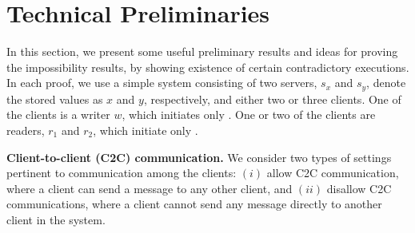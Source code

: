 \section{Technical Preliminaries}
\label{sec:summary}
In this section, we present some useful preliminary results and ideas for  proving the impossibility results, by showing existence of certain contradictory executions.
In each proof, we use a simple system consisting of two servers, $s_x$ and $s_y$, denote the stored values as $x$ and $y$, respectively, and either two or three clients.
One of the clients is a writer $w$, which initiates only \wots{}.
One or two of the clients are readers, $r_1$ and $r_2$, which initiate only \rots{}.

{\bf Client-to-client (C2C) communication.}
We consider two types of settings pertinent to communication among the clients: $(i)$ allow C2C communication, where a client can send a message to any other client, and $(ii)$ disallow C2C communications, where a client cannot send any message directly to another client in the system.


